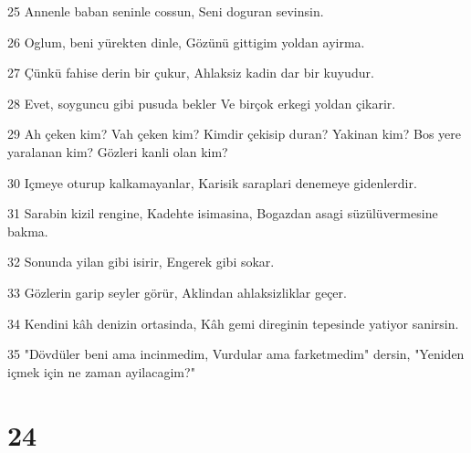 \par 25 Annenle baban seninle cossun, Seni doguran sevinsin.
\par 26 Oglum, beni yürekten dinle, Gözünü gittigim yoldan ayirma.
\par 27 Çünkü fahise derin bir çukur, Ahlaksiz kadin dar bir kuyudur.
\par 28 Evet, soyguncu gibi pusuda bekler Ve birçok erkegi yoldan çikarir.
\par 29 Ah çeken kim? Vah çeken kim? Kimdir çekisip duran? Yakinan kim? Bos yere yaralanan kim? Gözleri kanli olan kim?
\par 30 Içmeye oturup kalkamayanlar, Karisik saraplari denemeye gidenlerdir.
\par 31 Sarabin kizil rengine, Kadehte isimasina, Bogazdan asagi süzülüvermesine bakma.
\par 32 Sonunda yilan gibi isirir, Engerek gibi sokar.
\par 33 Gözlerin garip seyler görür, Aklindan ahlaksizliklar geçer.
\par 34 Kendini kâh denizin ortasinda, Kâh gemi direginin tepesinde yatiyor sanirsin.
\par 35 "Dövdüler beni ama incinmedim, Vurdular ama farketmedim" dersin, "Yeniden içmek için ne zaman ayilacagim?"

\chapter{24}

